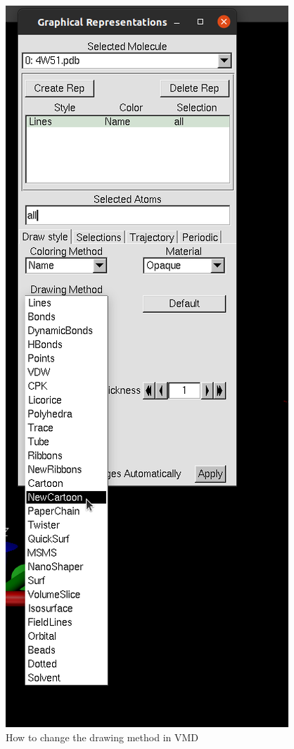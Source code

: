     \begin{figure}[H]
        \centering
        \includegraphics[height=0.7\textheight]{Graphics/ScreenShots/NewCartoonpng.png}
        \caption{How to change the drawing method in VMD}
        \label{fig:NewCartoon}
    \end{figure}

